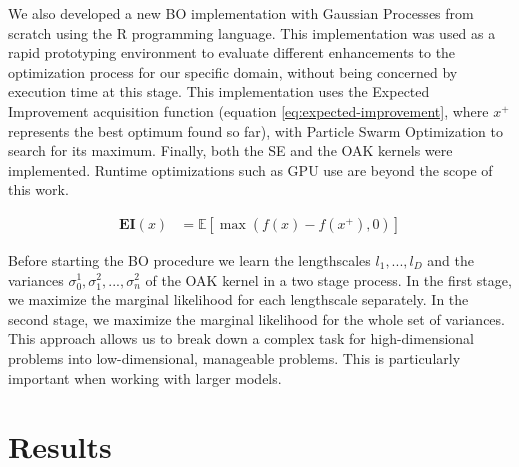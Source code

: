 \documentclass{IOS-Book-Article}
\begin{document}
	We also developed a new BO implementation with Gaussian Processes from scratch using the R programming language. This implementation was used as a rapid prototyping environment to evaluate different enhancements to the optimization process for our specific domain, without being concerned by execution time at this stage. This implementation uses the Expected Improvement acquisition function (equation \ref{eq:expected-improvement}, where $x^+$ represents the best optimum found so far), with Particle Swarm Optimization to search for its maximum. Finally, both the SE and the OAK kernels were implemented. Runtime optimizations such as GPU use are beyond the scope of this work.
	
	\begin{equation} \label{eq:expected-improvement}
		\begin{aligned}
			\mathbf{EI}(x) &= \mathbb{E}[\max(f(x)-f(x^+), 0)]
		\end{aligned}
	\end{equation}

	Before starting the BO procedure we learn the lengthscales $l_1, ..., l_D$ and the variances $\sigma_0^1, \sigma_1^2, ..., \sigma_n^2$ of the OAK kernel in a two stage process. In the first stage, we maximize the marginal likelihood for each lengthscale separately. In the second stage, we maximize the marginal likelihood for the whole set of variances. This approach allows us to break down a complex task for high-dimensional problems into low-dimensional, manageable problems. This is particularly important when working with larger models.
	
	\section{Results}
	
	
\end{document}
